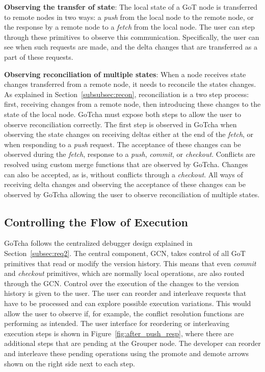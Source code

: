 {\bf Observing the transfer of state}: The local state of a GoT node is transferred to remote nodes in two ways: a {\em push} from the local node to the remote node, or the response by a remote node to a {\em fetch} from the local node. The user can step through these primitives to observe this communication. Specifically, the user can see when such requests are made, and the delta changes that are transferred as a part of these requests.

{\bf Observing reconciliation of multiple states}: When a node receives state changes transferred from a remote node, it needs to reconcile the states changes. As explained in Section~\ref{subsubsec:recon}, reconciliation is a two step process: first, receiving changes from a remote node, then introducing these changes to the state of the local node. GoTcha must expose both steps to allow the user to observe reconciliation correctly. The first step is observed in GoTcha when observing the state changes on receiving deltas either at the end of the {\em fetch}, or when responding to a {\em push}  request. The acceptance of these changes can be observed during the {\em fetch}, response to a {\em push}, {\em commit}, or {\em checkout}. Conflicts are resolved using custom merge functions that are observed by GoTcha. Changes can also be accepted, as is, without conflicts through a {\em checkout}. All ways of receiving delta changes and observing the acceptance of these changes can be observed by GoTcha allowing the user to observe reconciliation of multiple states.

\subsection{Controlling the Flow of Execution}
GoTcha follows the centralized debugger design explained in Section~\ref{subsec:req2}. The central component, GCN, takes control of all GoT primitives that read or modify the version history. This means that even {\em commit} and {\em checkout} primitives, which are normally local operations, are also routed through the GCN. Control over the execution of the changes to the version history is given to the user. The user can reorder and interleave requests that have to be processed and can explore possible execution variations. This would allow the user to observe if, for example, the conflict resolution functions are performing as intended. The user interface for reordering or interleaving execution steps is shown in Figure~\ref{fig:after_push_resp}, where there are additional steps that are pending at the Grouper node. The developer can reorder and interleave these pending operations using the promote and demote arrows shown on the right side next to each step.

